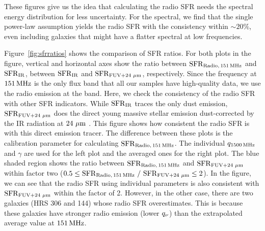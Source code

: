 These figures give us the idea that calculating the radio SFR needs the spectral energy distribution for less uncertainty.
For the spectral, we find that the single power-law assumption yields the radio SFR with the consistency within $\sim20\%$, even including galaxies that might have a flatter spectral at low frequencies.

Figure~\ref{fig:sfrratios} shows the comparison of SFR ratios.
For both plots in the figure, vertical and horizontal axes show the ratio between $\mathrm{SFR}_{\mathrm{Radio},\,151\,\mathrm{MHz}}$ and $\mathrm{SFR}_{\mathrm{IR}}$, between $\mathrm{SFR}_{\mathrm{IR}}$ and $\mathrm{SFR}_{\mathrm{FUV+24\,\,\mathrm{\mu m}}}$, respectively.
Since the frequency at $151\,\mathrm{MHz}$ is the only flux band that all our samples have high-quality data, we use the radio emission at the band.
Here, we check the consistency of the radio SFR with other SFR indicators.
While $\mathrm{SFR}_{\mathrm{IR}}$ traces the only dust emission, $\mathrm{SFR}_{\mathrm{FUV+24\,\,\mathrm{\mu m}}}$ does the direct young massive stellar emission dust-corrected by the IR radiation at $24\,\,\mathrm{\mu m}$ \citep{Murphy2011, Kennicutt2012}.
This figure shows how consistent the radio SFR is with this direct emission tracer.
The difference between these plots is the calibration parameter for calculating $\mathrm{SFR}_{\mathrm{Radio},\,151\,\mathrm{MHz}}$.
The individual $q_{1500\,\mathrm{MHz}}$ and $\gamma$ are used for the left plot and the averaged ones for the right plot.
The blue shaded region shows the ratio between $\mathrm{SFR}_{\mathrm{Radio},\,151\,\mathrm{MHz}}$ and $\mathrm{SFR}_{\mathrm{FUV+24\,\,\mathrm{\mu m}}}$ within factor two ($0.5 \leq \mathrm{SFR}_{\mathrm{Radio},\,151\,\mathrm{MHz}}\ /\ \mathrm{SFR}_{\mathrm{FUV+24\,\,\mathrm{\mu m}}} \leq 2$).
In the figure, we can see that the radio SFR using individual parameters is also consistent with $\mathrm{SFR}_{\mathrm{FUV+24\,\,\mathrm{\mu m}}}$ within the factor of 2.
However, in the other case, there are two galaxies (HRS 306 and 144) whose radio SFR overestimates.
This is because these galaxies have stronger radio emission (lower $q_{\nu}$) than the extrapolated average value at $151\,\mathrm{MHz}$.



%
%
